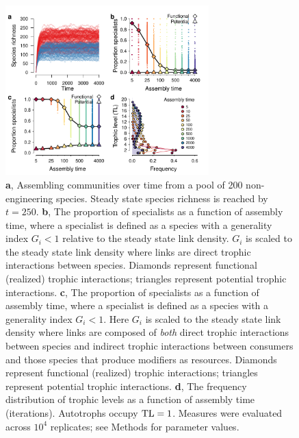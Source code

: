 \documentclass[twocolumn,preprintnumbers,amsmath,amssymb,superscriptaddress,linenumbers]{revtex4-1}
\begin{document}
\begin{figure}[h!]
\centering
\includegraphics[width=0.7\textwidth]{fig_trophic3_eng.pdf}
\caption{
\textbf{a}, Assembling communities over time from a pool of 200 non-engineering species. 
Steady state species richness is reached by $t=250$.
\textbf{b}, The proportion of specialists as a function of assembly time, where a specialist is defined as a species with a generality index $G_i < 1$ relative to the steady state link density.
$G_i$ is scaled to the steady state link density where links are direct trophic interactions between species.
Diamonds represent functional (realized) trophic interactions; triangles represent potential trophic interactions.
\textbf{c}, The proportion of specialists as a function of assembly time, where a specialist is defined as a species with a generality index $G_i < 1$.
Here $G_i$ is scaled to the steady state link density where links are composed of \emph{both} direct trophic interactions between species and indirect trophic interactions between consumers and those species that produce modifiers as resources.
Diamonds represent functional (realized) trophic interactions; triangles represent potential trophic interactions.
\textbf{d}, The frequency distribution of trophic levels as a function of assembly time (iterations). 
Autotrophs occupy ${\rm TL}=1$.
Measures were evaluated across $10^4$ replicates; see Methods for parameter values.
}
\label{fig:trophiceng}
\end{figure}
\end{document}
